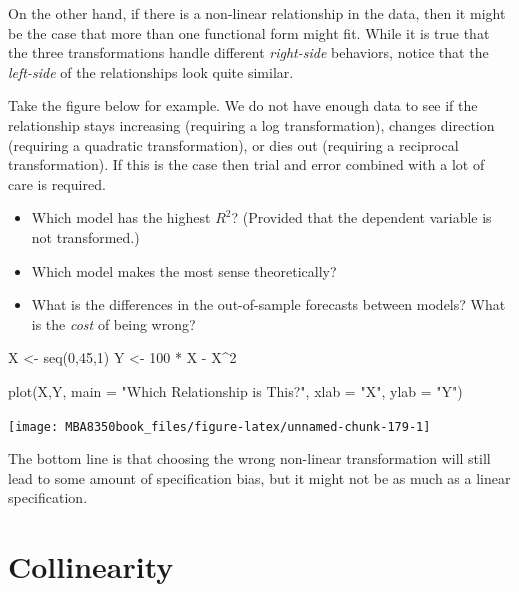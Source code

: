 \documentclass[
]{book}
\newenvironment{Shaded}{\begin{snugshade}}{\end{snugshade}}
\newcommand{\AttributeTok}[1]{\textcolor[rgb]{0.77,0.63,0.00}{#1}}
\newcommand{\DecValTok}[1]{\textcolor[rgb]{0.00,0.00,0.81}{#1}}
\newcommand{\FunctionTok}[1]{\textcolor[rgb]{0.00,0.00,0.00}{#1}}
\newcommand{\NormalTok}[1]{#1}
\newcommand{\OtherTok}[1]{\textcolor[rgb]{0.56,0.35,0.01}{#1}}
\newcommand{\SpecialCharTok}[1]{\textcolor[rgb]{0.00,0.00,0.00}{#1}}
\newcommand{\StringTok}[1]{\textcolor[rgb]{0.31,0.60,0.02}{#1}}
\begin{document}
On the other hand, if there is a non-linear relationship in the data, then it might be the case that more than one functional form might fit. While it is true that the three transformations handle different \emph{right-side} behaviors, notice that the \emph{left-side} of the relationships look quite similar.

Take the figure below for example. We do not have enough data to see if the relationship stays increasing (requiring a log transformation), changes direction (requiring a quadratic transformation), or dies out (requiring a reciprocal transformation). If this is the case then trial and error combined with a lot of care is required.

\begin{itemize}
\item
  Which model has the highest \(R^2\)? (Provided that the dependent variable is not transformed.)
\item
  Which model makes the most sense theoretically?
\item
  What is the differences in the out-of-sample forecasts between models? What is the \emph{cost} of being wrong?
\end{itemize}

\begin{Shaded}
\begin{Highlighting}[]
\NormalTok{X }\OtherTok{\textless{}{-}} \FunctionTok{seq}\NormalTok{(}\DecValTok{0}\NormalTok{,}\DecValTok{45}\NormalTok{,}\DecValTok{1}\NormalTok{)}
\NormalTok{Y }\OtherTok{\textless{}{-}} \DecValTok{100} \SpecialCharTok{*}\NormalTok{ X }\SpecialCharTok{{-}}\NormalTok{ X}\SpecialCharTok{\^{}}\DecValTok{2}

\FunctionTok{plot}\NormalTok{(X,Y,}
     \AttributeTok{main =} \StringTok{"Which Relationship is This?"}\NormalTok{,}
     \AttributeTok{xlab =} \StringTok{"X"}\NormalTok{,}
     \AttributeTok{ylab =} \StringTok{"Y"}\NormalTok{)}
\end{Highlighting}
\end{Shaded}

\begin{center}\texttt{[image: MBA8350book\_files/figure-latex/unnamed-chunk-179-1]} \end{center}

The bottom line is that choosing the wrong non-linear transformation will still lead to some amount of specification bias, but it might not be as much as a linear specification.

\hypertarget{collinearity}{%
\section{Collinearity}\label{collinearity}}
\end{document}
